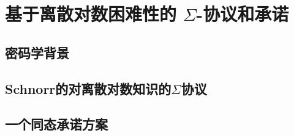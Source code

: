 \chapter{基于离散对数困难性的 $\Sigma$-协议和承诺}\label{chp:12sigma}

\section{密码学背景}\label{12.1}
\section{Schnorr的对离散对数知识的$\Sigma$协议}\label{12.2}
\section{一个同态承诺方案}\label{12.3}
